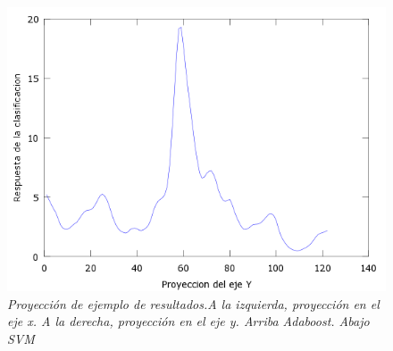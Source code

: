 \begin{figure}[H]
  \includegraphics[scale=.4]{images/plots/svm6Y}
  \caption{\em  Proyección de ejemplo de resultados.A la izquierda, proyección en el eje x. A la derecha, proyección en el eje y. Arriba Adaboost. Abajo SVM}   
  \label{fig:pro6}
\end{figure}
